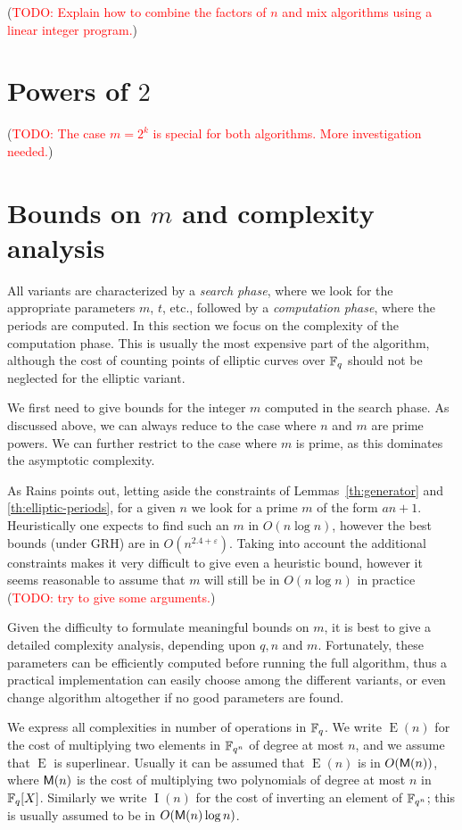 \documentclass{article}
\newcommand{\todo}[1]{(\textcolor{red}{TODO: #1})}
\DeclareMathOperator{\Ext}{E}
\DeclareMathOperator{\Inv}{I}
\begin{document}
\todo{Explain how to combine the factors of $n$ and mix algorithms
  using a linear integer program.}

\section{Powers of $2$}

\todo{The case $m=2^k$ is special for both algorithms. More
  investigation needed.}


\section{Bounds on $m$ and complexity analysis}

All variants are characterized by a \emph{search phase}, where we look
for the appropriate parameters $m$, $t$, etc., followed by a
\emph{computation phase}, where the periods are computed. In this
section we focus on the complexity of the computation phase. This is
usually the most expensive part of the algorithm, although the cost of
counting points of elliptic curves over $\mathbb{F}_q$ should not be neglected
for the elliptic variant.

We first need to give bounds for the integer $m$ computed in the
search phase. As discussed above, we can always reduce to the case
where $n$ and $m$ are prime powers. We can further restrict to the
case where $m$ is prime, as this dominates the asymptotic complexity.

As Rains points out, letting aside the constraints of
Lemmas~\ref{th:generator} and \ref{th:elliptic-periods}, for a given
$n$ we look for a prime $m$ of the form $an+1$. Heuristically one
expects to find such an $m$ in $O(n\log n)$, however the best bounds
(under GRH) are in $O(n^{2.4+\varepsilon})$. Taking into account the
additional constraints makes it very difficult to give even a
heuristic bound, however it seems reasonable to assume that $m$ will
still be in $O(n\log n)$ in practice \todo{try to give some
  arguments.}

Given the difficulty to formulate meaningful bounds on $m$, it is best
to give a detailed complexity analysis, depending upon $q,n$ and
$m$. Fortunately, these parameters can be efficiently computed before
running the full algorithm, thus a practical implementation can easily
choose among the different variants, or even change algorithm
altogether if no good parameters are found.

We express all complexities in number of operations in $\mathbb{F}_q$. We
write $\Ext(n)$ for the cost of multiplying two elements in $\mathbb{F}_{q^n}$
of degree at most $n$, and we assume that $\Ext$ is
superlinear. Usually it can be assumed that $\Ext(n)$ is in
$O(\mathsf{M}(n))$, where $\mathsf{M}(n)$ is the cost of multiplying two
polynomials of degree at most $n$ in $\mathbb{F}_q[X]$. Similarly we write
$\Inv(n)$ for the cost of inverting an element of $\mathbb{F}_{q^n}$; this is
usually assumed to be in $O(\mathsf{M}(n)\log n)$.
\end{document}
